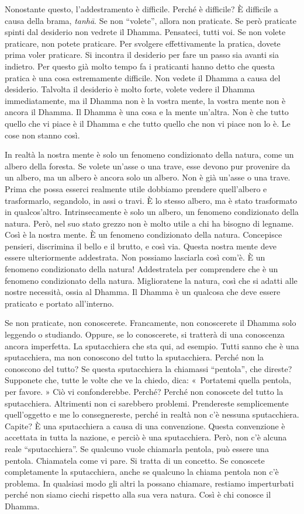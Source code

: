 Nonostante questo, l'addestramento è difficile. Perché è difficile? È
difficile a causa della brama, \emph{tanhā}. Se non ``volete'', allora
non praticate. Se però praticate spinti dal desiderio non vedrete il
Dhamma. Pensateci, tutti voi. Se non volete praticare, non potete
praticare. Per svolgere effettivamente la pratica, dovete prima voler
praticare. Si incontra il desiderio per fare un passo sia avanti sia
indietro. Per questo già molto tempo fa i praticanti hanno detto che
questa pratica è una cosa estremamente difficile. Non vedete il Dhamma a
causa del desiderio. Talvolta il desiderio è molto forte, volete vedere
il Dhamma immediatamente, ma il Dhamma non è la vostra mente, la vostra
mente non è ancora il Dhamma. Il Dhamma è una cosa e la mente un'altra.
Non è che tutto quello che vi piace è il Dhamma e che tutto quello che
non vi piace non lo è. Le cose non stanno così.

In realtà la nostra mente è solo un fenomeno condizionato della natura,
come un albero della foresta. Se volete un'asse o una trave, esse devono
pur provenire da un albero, ma un albero è ancora solo un albero. Non è
già un'asse o una trave. Prima che possa esserci realmente utile
dobbiamo prendere quell'albero e trasformarlo, segandolo, in assi o
travi. È lo stesso albero, ma è stato trasformato in qualcos'altro.
Intrinsecamente è solo un albero, un fenomeno condizionato della natura.
Però, nel suo stato grezzo non è molto utile a chi ha bisogno di
legname. Così è la nostra mente. È un fenomeno condizionato della
natura. Concepisce pensieri, discrimina il bello e il brutto, e così
via. Questa nostra mente deve essere ulteriormente addestrata. Non
possiamo lasciarla così com'è. È un fenomeno condizionato della natura!
Addestratela per comprendere che è un fenomeno condizionato della
natura. Miglioratene la natura, così che si adatti alle nostre
necessità, ossia al Dhamma. Il Dhamma è un qualcosa che deve essere
praticato e portato all'interno.

Se non praticate, non conoscerete. Francamente, non conoscerete il
Dhamma solo leggendo o studiando. Oppure, se lo conoscerete, si tratterà
di una conoscenza ancora imperfetta. La sputacchiera che sta qui, ad
esempio. Tutti sanno che è una sputacchiera, ma non conoscono del tutto
la sputacchiera. Perché non la conoscono del tutto? Se questa
sputacchiera la chiamassi ``pentola'', che direste? Supponete che, tutte
le volte che ve la chiedo, dica: «~Portatemi quella pentola, per favore.
» Ciò vi confonderebbe. Perché? Perché non conoscete del tutto la
sputacchiera. Altrimenti non ci sarebbero problemi. Prendereste
semplicemente quell'oggetto e me lo consegnereste, perché in realtà non
c'è nessuna sputacchiera. Capite? È una sputacchiera a causa di una
convenzione. Questa convenzione è accettata in tutta la nazione, e
perciò è una sputacchiera. Però, non c'è alcuna reale ``sputacchiera''.
Se qualcuno vuole chiamarla pentola, può essere una pentola. Chiamatela
come vi pare. Si tratta di un concetto. Se conoscete completamente la
sputacchiera, anche se qualcuno la chiama pentola non c'è problema. In
qualsiasi modo gli altri la possano chiamare, restiamo imperturbati
perché non siamo ciechi rispetto alla sua vera natura. Così è chi
conosce il Dhamma.

